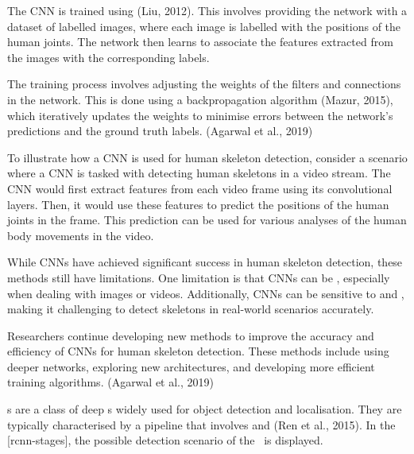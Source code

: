 
The CNN is trained using  (\scc Liu, 2012). This involves providing the network with a dataset of labelled images, where each image is labelled with the positions of the human joints. The network then learns to associate the features extracted from the images with the corresponding labels.

The training process involves adjusting the weights of the filters and connections in the network. This is done using a backpropagation algorithm (\scc Mazur, 2015), which iteratively updates the weights to minimise errors between the network's predictions and the ground truth labels. (\scc Agarwal et al., 2019)


To illustrate how a CNN is used for human skeleton detection, consider a scenario where a CNN is tasked with detecting human skeletons in a video stream. The CNN would first extract features from each video frame using its convolutional layers. Then, it would use these features to predict the positions of the human joints in the frame. This prediction can be used for various analyses of the human body movements in the video.


While CNNs have achieved significant success in human skeleton detection, these methods still have limitations. One limitation is that CNNs can be , especially when dealing with  images or videos. Additionally, CNNs can be sensitive to  and , making it challenging to detect skeletons in real-world scenarios accurately.

Researchers continue developing new methods to improve the accuracy and efficiency of CNNs for human skeleton detection. These methods include using deeper networks, exploring new architectures, and developing more efficient training algorithms. (\scc Agarwal et al., 2019)

\RCNN\-s are a class of deep \CNN\-s widely used for object detection and localisation. They are typically characterised by a  pipeline that involves  and  (\scc Ren et al., 2015). In the [rcnn-stages], the possible detection scenario of the \RCNN\ is displayed.

